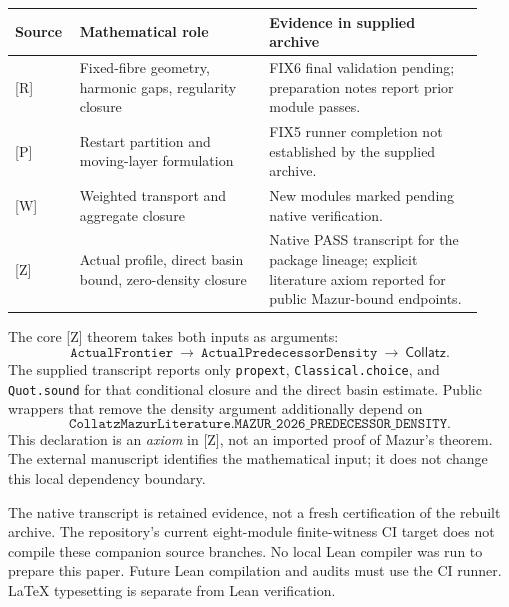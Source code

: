 \documentclass[11pt,a4paper]{article}
\theoremstyle{definition}
\newcommand{\CC}{\mathsf{Collatz}}
\begin{document}
\begin{center}
\small
\begin{tabular}{@{}p{0.12\linewidth}p{0.38\linewidth}p{0.43\linewidth}@{}}
\toprule
Source & Mathematical role & Evidence in supplied archive\\
\midrule
{[R]} & Fixed-fibre geometry, harmonic gaps, regularity closure &
FIX6 final validation pending; preparation notes report prior module passes.\\[4pt]
{[P]} & Restart partition and moving-layer formulation &
FIX5 runner completion not established by the supplied archive.\\[4pt]
{[W]} & Weighted transport and aggregate closure &
New modules marked pending native verification.\\[4pt]
{[Z]} & Actual profile, direct basin bound, zero-density closure &
Native PASS transcript for the package lineage; explicit literature axiom
reported for public Mazur-bound endpoints.\\
\bottomrule
\end{tabular}
\end{center}

The core [Z] theorem takes both inputs as arguments:
\[
 \texttt{ActualFrontier}\ \longrightarrow\
 \texttt{ActualPredecessorDensity}\ \longrightarrow\ \CC.
\]
The supplied transcript reports only \texttt{propext},
\texttt{Classical.choice}, and \texttt{Quot.sound} for that conditional
closure and the direct basin estimate. Public wrappers that remove the
density argument additionally depend on
\[
 \texttt{CollatzMazurLiterature.MAZUR\_2026\_PREDECESSOR\_DENSITY}.
\]
This declaration is an \emph{axiom} in [Z], not an imported proof of
Mazur's theorem. The external manuscript identifies the mathematical input;
it does not change this local dependency boundary.

The native transcript is retained evidence, not a fresh certification of
the rebuilt archive. The repository's current eight-module finite-witness
CI target does not compile these companion source branches. No local Lean
compiler was run to prepare this paper. Future Lean compilation and audits
must use the CI runner. LaTeX typesetting is separate from Lean verification.
\end{document}

